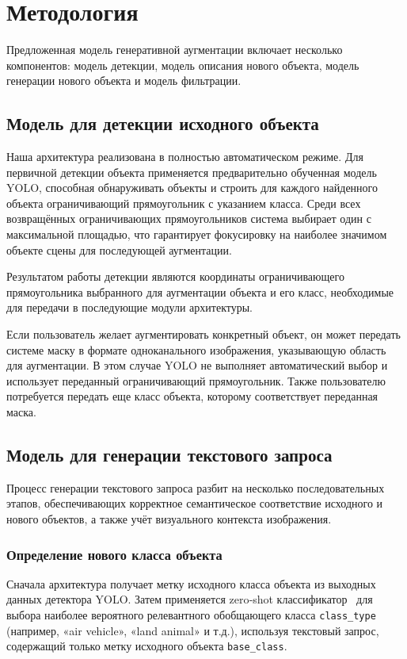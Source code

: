 \section{Методология}
Предложенная модель генеративной аугментации включает несколько компонентов: модель детекции, модель описания нового объекта, модель генерации нового объекта и модель фильтрации.

\subsection{Модель для детекции исходного объекта}
Наша архитектура реализована в полностью автоматическом режиме. Для первичной детекции объекта применяется предварительно обученная модель YOLO, способная обнаруживать объекты и строить для каждого найденного объекта ограничивающий прямоугольник с указанием класса. Среди всех возвращённых ограничивающих прямоугольников система выбирает один с максимальной площадью, что гарантирует фокусировку на наиболее значимом объекте сцены для последующей аугментации. 

Результатом работы детекции являются координаты ограничивающего прямоугольника выбранного для аугментации объекта и его класс, необходимые для передачи в последующие модули архитектуры.

Если пользователь желает аугментировать конкретный объект, он может передать системе маску в формате одноканального изображения, указывающую область для аугментации. В этом случае YOLO не выполняет автоматический выбор и использует переданный ограничивающий прямоугольник. Также пользователю потребуется передать еще класс объекта, которому соответствует переданная маска.

\subsection{Модель для генерации текстового запроса}
Процесс генерации текстового запроса разбит на несколько последовательных этапов, обеспечивающих корректное семантическое соответствие исходного и нового объектов, а также учёт визуального контекста изображения.

\subsubsection{Определение нового класса объекта}
Сначала архитектура получает метку исходного класса объекта из выходных данных детектора YOLO. Затем применяется zero‐shot классификатор~\cite{DBLP:journals/corr/abs-1909-00161} для выбора наиболее вероятного релевантного обобщающего класса \texttt{class\_type}  (например, «air vehicle», «land animal» и т.д.), используя текстовый запрос, содержащий только метку исходного объекта \texttt{base\_class}.


